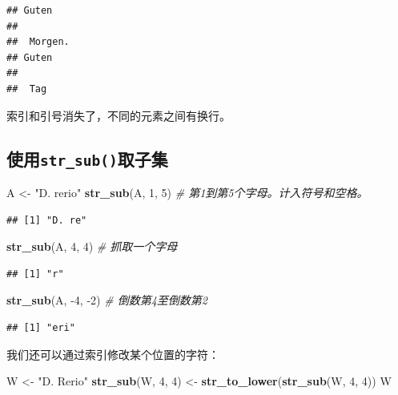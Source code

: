 \documentclass[]{book}
\newenvironment{Shaded}{\begin{snugshade}}{\end{snugshade}}
\newcommand{\CommentTok}[1]{\textcolor[rgb]{0.56,0.35,0.01}{\textit{#1}}}
\newcommand{\DecValTok}[1]{\textcolor[rgb]{0.00,0.00,0.81}{#1}}
\newcommand{\KeywordTok}[1]{\textcolor[rgb]{0.13,0.29,0.53}{\textbf{#1}}}
\newcommand{\NormalTok}[1]{#1}
\newcommand{\StringTok}[1]{\textcolor[rgb]{0.31,0.60,0.02}{#1}}
\begin{document}
\begin{verbatim}
## Guten
## 
##  Morgen.
## Guten
## 
##  Tag
\end{verbatim}

索引和引号消失了，不同的元素之间有换行。

\hypertarget{str_sub}{%
\subsection{\texorpdfstring{使用\texttt{str\_sub()}取子集}{使用str\_sub()取子集}}\label{str_sub}}

\begin{Shaded}
\begin{Highlighting}[]
\NormalTok{A <-}\StringTok{ "D. rerio"}
\KeywordTok{str_sub}\NormalTok{(A, }\DecValTok{1}\NormalTok{, }\DecValTok{5}\NormalTok{) }\CommentTok{# 第1到第5个字母。计入符号和空格。}
\end{Highlighting}
\end{Shaded}

\begin{verbatim}
## [1] "D. re"
\end{verbatim}

\begin{Shaded}
\begin{Highlighting}[]
\KeywordTok{str_sub}\NormalTok{(A, }\DecValTok{4}\NormalTok{, }\DecValTok{4}\NormalTok{) }\CommentTok{# 抓取一个字母}
\end{Highlighting}
\end{Shaded}

\begin{verbatim}
## [1] "r"
\end{verbatim}

\begin{Shaded}
\begin{Highlighting}[]
\KeywordTok{str_sub}\NormalTok{(A, }\DecValTok{-4}\NormalTok{, }\DecValTok{-2}\NormalTok{) }\CommentTok{# 倒数第4至倒数第2}
\end{Highlighting}
\end{Shaded}

\begin{verbatim}
## [1] "eri"
\end{verbatim}

我们还可以通过索引修改某个位置的字符：

\begin{Shaded}
\begin{Highlighting}[]
\NormalTok{W <-}\StringTok{ "D. Rerio"}
\KeywordTok{str_sub}\NormalTok{(W, }\DecValTok{4}\NormalTok{, }\DecValTok{4}\NormalTok{) <-}\StringTok{ }\KeywordTok{str_to_lower}\NormalTok{(}\KeywordTok{str_sub}\NormalTok{(W, }\DecValTok{4}\NormalTok{, }\DecValTok{4}\NormalTok{))}
\NormalTok{W}
\end{Highlighting}
\end{Shaded}
\end{document}
